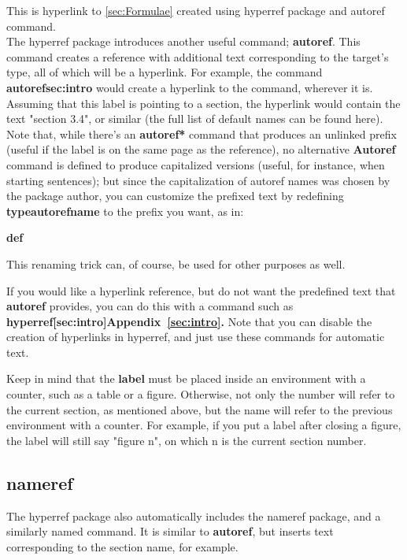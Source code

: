 \documentclass{article}
\begin{document}
This is hyperlink to \autoref{sec:Formulae} created using hyperref package and autoref command.\\

The hyperref package introduces another useful command; \textbf{autoref{}}. This command creates a reference with additional text corresponding to the target's type, all of which will be a hyperlink. For example, the command \textbf{autoref{sec:intro}} would create a hyperlink to the \label{sec:intro} command, wherever it is. Assuming that this label is pointing to a section, the hyperlink would contain the text "section 3.4", or similar (the full list of default names can be found here). Note that, while there's an \textbf{autoref* }command that produces an unlinked prefix (useful if the label is on the same page as the reference), no alternative \textbf{Autoref} command is defined to produce capitalized versions (useful, for instance, when starting sentences); but since the capitalization of autoref names was chosen by the package author, you can customize the prefixed text by redefining \textbf{typeautorefname} to the prefix you want, as in:

\textbf{def~~}

This renaming trick can, of course, be used for other purposes as well.

    If you would like a hyperlink reference, but do not want the predefined text that\textbf{ autoref{}} provides, you can do this with a command such as \textbf{hyperref[sec:intro]{Appendix~\ref*{sec:intro}}.} Note that you can disable the creation of hyperlinks in hyperref, and just use these commands for automatic text.

    Keep in mind that the \textbf{label} must be placed inside an environment with a counter, such as a table or a figure. Otherwise, not only the number will refer to the current section, as mentioned above, but the name will refer to the previous environment with a counter. For example, if you put a label after closing a figure, the label will still say "figure n", on which n is the current section number.

\subsection{nameref}

The hyperref package also automatically includes the nameref package, and a similarly named command. It is similar to \textbf{autoref{}}, but inserts text corresponding to the section name, for example.
\end{document}
